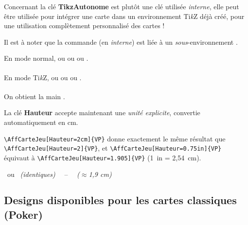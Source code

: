 \documentclass[a4paper]{article}
\providecommand\tikzlogo{Ti\textit{k}Z}
\let\TikZ\tikzlogo
\newcommand\ctex[1]{\tcbox[vignettelatex]{#1}\xspace}
\newcommand\cmaj[1]{\tcbox[vignetteMaJ]{#1}\xspace}
\newcommand\Cle[1]{{\bfseries\sffamily\textlangle #1\textrangle}}
\begin{document}
\begin{codeinfo}
Concernant la clé \Cle{TikzAutonome} est plutôt une clé utilisée \textit{interne}, elle peut être utilisée pour intégrer une carte dans un environnement \TikZ{} déjà créé, pour une utilisation complètement personnalisé des cartes !

\smallskip

Il est à noter que la commande (en \textit{interne}) est liée à un \textit{sous}-environnement \ctex{scope}.
\end{codeinfo}

\begin{codetex}[]
En mode normal,  ou  ou
 ou .\\ \\
En mode \TikZ, 
ou 
ou 
ou .\\ \\
On obtient la main .
\end{codetex}

\begin{codeinfo}
\cmaj{0.40a} La clé \Cle{Hauteur} accepte maintenant une \textit{unité explicite}, convertie automatiquement en cm.

\verb|\AffCarteJeu[Hauteur=2cm]{VP}| donne exactement le même résultat que \verb|\AffCarteJeu[Hauteur=2]{VP}|, et \verb|\AffCarteJeu[Hauteur=0.75in]{VP}| équivaut à \verb|\AffCarteJeu[Hauteur=1.905]{VP}| (1~in = 2,54~cm).
\end{codeinfo}

\begin{codetex}[]
 ~ou~  \emph{(identiques)} ~~--~~  \emph{(}$\approx$\emph{1,9 cm)}
\end{codetex}

\subsection{Designs disponibles pour les cartes classiques (Poker)}
\end{document}
